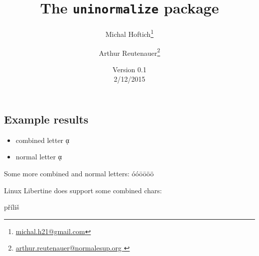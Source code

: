 \documentclass{article}
\begin{document}
\title{The \texttt{uninormalize} package}
\author{Michal Hoftich\footnote{\url{michal.h21@gmail.com}} \and Arthur Reutenauer\footnote{\url{arthur.reutenauer@normalesup.org }}}
\date{Version 0.1\\2/12/2015}
\maketitle



\subsection{Example results}

\begin{itemize}
  \item combined letter ᾳ %
  \item normal letter ᾳ%
\end{itemize}

Some more combined and normal letters: 
óóōōöö

Linux Libertine does support some combined chars: \parbox{4em}{příliš}
\end{document}
